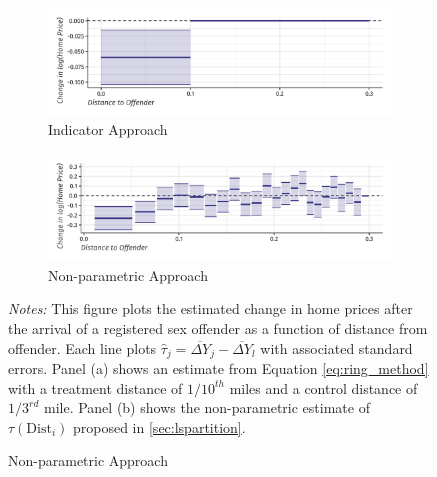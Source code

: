 \documentclass[10pt]{article}
\newcommand{\dist}{\text{Dist}}
\begin{document}
\begin{figure}[tb!]
    \caption{Effects of Offender Arrival on Home Prices \citep{Linden_Rockoff_2008}}\label{fig:lr}

    \begin{subfigure}{\textwidth}
        \caption{Indicator Approach}
        \centering
        \vspace{-2.5mm}
        \includegraphics[width=\textwidth]{../../figures/linden_rockoff_did.pdf}
    \end{subfigure}
    \hfill
    \begin{subfigure}{\textwidth}
        \caption{Non-parametric Approach}
        \centering
        \vspace{-2.5mm}
        \includegraphics[width=\textwidth]{../../figures/linden_rockoff.pdf}
    \end{subfigure}

    {\footnotesize{\it Notes:} This figure plots the estimated change in home prices after the arrival of a registered sex offender as a function of distance from offender. Each line plots $\hat{\tau}_j = \overline{\Delta Y}_j - \overline{\Delta Y}_l $ with associated standard errors. Panel (a) shows an estimate from Equation \ref{eq:ring_method} with a treatment distance of $1/10^{th}$ miles and a control distance of $1/3^{rd}$ mile. Panel (b) shows the non-parametric estimate of $\tau(\dist_i)$ proposed in \autoref{sec:lspartition}.}
\end{figure}
\end{document}
